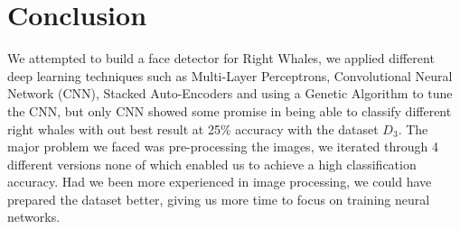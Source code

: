 \section{Conclusion}
We attempted to build a face detector for Right Whales, we applied different deep learning techniques such as Multi-Layer Perceptrons, Convolutional Neural Network (CNN), Stacked Auto-Encoders and using a Genetic Algorithm to tune the CNN, but only CNN showed some promise in being able to classify different right whales with out best result at 25\% accuracy with the dataset $D_{3}$. The major problem we faced was pre-processing the images, we iterated through 4 different versions none of which enabled us to achieve a high classification accuracy. Had we been more experienced in image processing, we could have prepared the dataset better, giving us more time to focus on training neural networks.